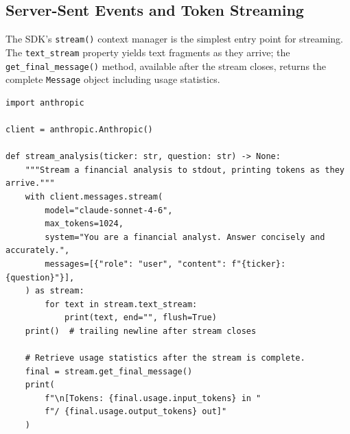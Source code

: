 \subsection{Server-Sent Events and Token Streaming}
\label{app:sdk-commercial:streaming:sse}

The SDK's \texttt{stream()} context manager is the simplest entry point for streaming.
The \texttt{text\_stream} property yields text fragments as they arrive; the
\texttt{get\_final\_message()} method, available after the stream closes, returns the
complete \texttt{Message} object including usage statistics.

\begin{verbatim}
import anthropic

client = anthropic.Anthropic()

def stream_analysis(ticker: str, question: str) -> None:
    """Stream a financial analysis to stdout, printing tokens as they arrive."""
    with client.messages.stream(
        model="claude-sonnet-4-6",
        max_tokens=1024,
        system="You are a financial analyst. Answer concisely and accurately.",
        messages=[{"role": "user", "content": f"{ticker}: {question}"}],
    ) as stream:
        for text in stream.text_stream:
            print(text, end="", flush=True)
    print()  # trailing newline after stream closes

    # Retrieve usage statistics after the stream is complete.
    final = stream.get_final_message()
    print(
        f"\n[Tokens: {final.usage.input_tokens} in "
        f"/ {final.usage.output_tokens} out]"
    )
\end{verbatim}

